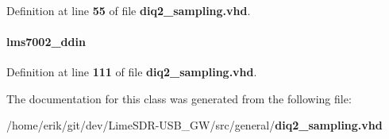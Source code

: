 \paragraph[{lms7002\+\_\+ddin}]{ {\bfseries \textcolor{vhdlchar}{ }} \hspace{0.3cm}{\ttfamily [Component]}}\label{classdiq2__sampling_1_1arch_ab676c6cbff8c84895973b39e2de78e96}


Definition at line {\bf 55} of file {\bf diq2\+\_\+sampling.\+vhd}.

\paragraph[{lms7002\+\_\+ddin\+\_\+inst1}]{ {\bfseries \textcolor{vhdlchar}{lms7002\+\_\+ddin}\textcolor{vhdlchar}{ }} \hspace{0.3cm}{\ttfamily [Instantiation]}}\label{classdiq2__sampling_1_1arch_a8bc4d6067f9b7bff3cebe7ebf058fdd7}


Definition at line {\bf 111} of file {\bf diq2\+\_\+sampling.\+vhd}.



The documentation for this class was generated from the following file\+:\begin{DoxyCompactItemize}
\item 
/home/erik/git/dev/\+Lime\+S\+D\+R-\/\+U\+S\+B\+\_\+\+G\+W/src/general/{\bf diq2\+\_\+sampling.\+vhd}\end{DoxyCompactItemize}
